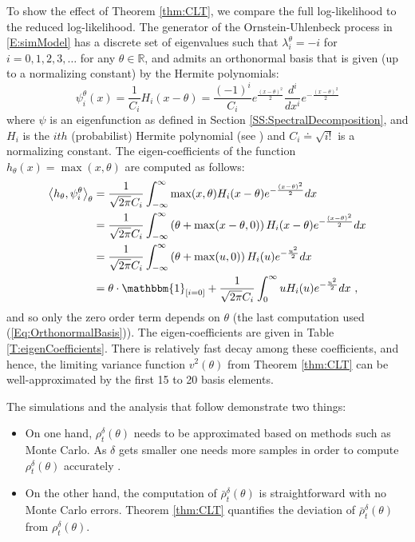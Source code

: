 \documentclass{article}
\newcommand{\indicator}[1]{\mathbbm{1}_{\left[ {#1} \right] }}
\begin{document}
To show the effect of Theorem \ref{thm:CLT}, we compare the full log-likelihood to the reduced log-likelihood. The generator of the Ornstein-Uhlenbeck process in \eqref{E:simModel} has a discrete set of eigenvalues such that $\lambda_i^{\theta} = -i$ for $i=0,1,2,3,\dots$ for any $\theta\in\mathbb R$, and admits an orthonormal basis that is given (up to a normalizing constant) by the Hermite polynomials:
\[\psi_i^{\theta}(x) =\frac{1}{C_i}H_i(x-\theta) =  \frac{(-1)^i}{C_i}e^{\frac{(x-\theta)^2}{2}}\frac{d^i}{dx^i}e^{-\frac{(x-\theta)^2}{2}}\]
where $\psi$ is an eigenfunction as defined in Section \ref{SS:SpectralDecomposition}, and $H_i$ is the $ith$ (probabilist) Hermite polynomial (see \cite{Abramowitz}) and $C_i\doteq\sqrt{i!}$ is a normalizing constant. The eigen-coefficients of the function $h_{\theta}(x) = \max(x,\theta)$ are computed as follows:
\begin{align*}
\left<h_\theta,\psi_i^\theta\right>_\theta &= \frac{1}{\sqrt{2\pi}C_i}\int_{-\infty}^\infty \max(x,\theta)H_i(x-\theta)e^{-\frac{(x-\theta)^2}{2}}dx\\
&=\frac{1}{\sqrt{2\pi}C_i}\int_{-\infty}^\infty \left(\theta+\max(x-\theta,0)\right)H_i(x-\theta)e^{-\frac{(x-\theta)^2}{2}}dx\\
&=\frac{1}{\sqrt{2\pi}C_i}\int_{-\infty}^\infty \left(\theta+\max(u,0)\right)H_i(u)e^{-\frac{u^2}{2}}dx\\
&=\theta\cdot\indicator{i=0}+\frac{1}{\sqrt{2\pi}C_i}\int_0^\infty uH_i(u)e^{-\frac{u^2}{2}}dx\ ,
\end{align*}
and so only the zero order term depends on $\theta$ (the last computation used (\ref{Eq:OrthonormalBasis})). The eigen-coefficients are given in Table \ref{T:eigenCoefficients}. There is relatively fast decay among these coefficients, and hence, the limiting variance function $v^2(\theta)$ from Theorem \ref{thm:CLT} can be well-approximated by the first 15 to 20 basis elements.

The simulations and the analysis that follow demonstrate two things:
\begin{itemize}
 \item On one hand, $\rho^{\delta}_{t}(\theta)$ needs to be approximated based on methods such as Monte Carlo. As $\delta$ gets smaller  one needs more samples in order to compute $\rho^{\delta}_{t}(\theta)$ accurately .
\item On the other hand, the computation of $\bar{\rho}^{\delta}_{t}(\theta)$ is straightforward with no Monte Carlo errors. Theorem \ref{thm:CLT} quantifies the deviation of
$\bar{\rho}^{\delta}_{t}(\theta)$ from $\rho^{\delta}_{t}(\theta)$.
\end{itemize}
\end{document}
